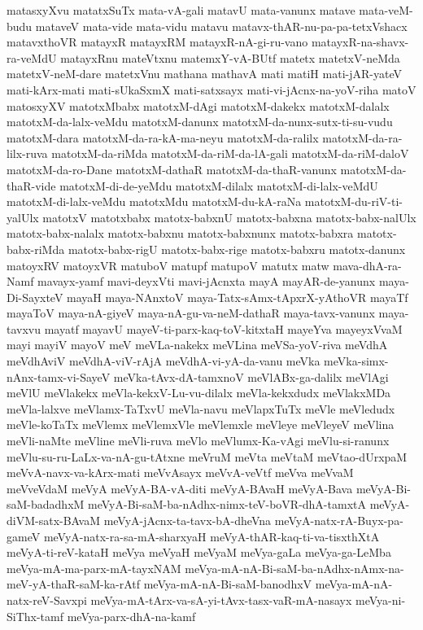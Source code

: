 {matasxyXvu
matatxSuTx
mata-vA-gali
matavU
mata-vanunx
matave
mata-veM-budu
mataveV
mata-vide
mata-vidu
matavu
matavx-thAR-nu-pa-pa-tetxVshacx
matavxthoVR
matayxR
matayxRM
matayxR-nA-gi-ru-vano
matayxR-na-shavx-ra-veMdU
matayxRnu
mateVtxnu
matemxY-vA-BUtf
matetx
matetxV-neMda
matetxV-neM-dare
matetxVnu
mathana
mathavA
mati
matiH
mati-jAR-yateV
mati-kArx-mati
mati-sUkaSxmX
mati-satxsayx
mati-vi-jAcnx-na-yoV-riha
matoV
matosxyXV
matotxMbabx
matotxM-dAgi
matotxM-dakekx
matotxM-dalalx
matotxM-da-lalx-veMdu
matotxM-danunx
matotxM-da-nunx-sutx-ti-su-vudu
matotxM-dara
matotxM-da-ra-kA-ma-neyu
matotxM-da-ralilx
matotxM-da-ra-lilx-ruva
matotxM-da-riMda
matotxM-da-riM-da-lA-gali
matotxM-da-riM-daloV
matotxM-da-ro-Dane
matotxM-dathaR
matotxM-da-thaR-vanunx
matotxM-da-thaR-vide
matotxM-di-de-yeMdu
matotxM-dilalx
matotxM-di-lalx-veMdU
matotxM-di-lalx-veMdu
matotxMdu
matotxM-du-kA-raNa
matotxM-du-riV-ti-yalUlx
matotxV
matotxbabx
matotx-babxnU
matotx-babxna
matotx-babx-nalUlx
matotx-babx-nalalx
matotx-babxnu
matotx-babxnunx
matotx-babxra
matotx-babx-riMda
matotx-babx-rigU
matotx-babx-rige
matotx-babxru
matotx-danunx
matoyxRV
matoyxVR
matuboV
matupf
matupoV
matutx
matw
mava-dhA-ra-Namf
mavayx-yamf
mavi-deyxVti
mavi-jAcnxta
mayA
mayAR-de-yanunx
maya-Di-SayxteV
mayaH
maya-NAnxtoV
maya-Tatx-sAmx-tApxrX-yAthoVR
mayaTf
mayaToV
maya-nA-giyeV
maya-nA-gu-va-neM-dathaR
maya-tavx-vanunx
maya-tavxvu
mayatf
mayavU
mayeV-ti-parx-kaq-toV-kitxtaH
mayeYva
mayeyxVvaM
mayi
mayiV
mayoV
meV
meVLa-nakekx
meVLina
meVSa-yoV-riva
meVdhA
meVdhAviV
meVdhA-viV-rAjA
meVdhA-vi-yA-da-vanu
meVka
meVka-simx-nAnx-tamx-vi-SayeV
meVka-tAvx-dA-tamxnoV
meVlABx-ga-dalilx
meVlAgi
meVlU
meVlakekx
meVla-kekxV-Lu-vu-dilalx
meVla-kekxdudx
meVlakxMDa
meVla-lalxve
meVlamx-TaTxvU
meVla-navu
meVlapxTuTx
meVle
meVledudx
meVle-koTaTx
meVlemx
meVlemxVle
meVlemxle
meVleye
meVleyeV
meVlina
meVli-naMte
meVline
meVli-ruva
meVlo
meVlumx-Ka-vAgi
meVlu-si-ranunx
meVlu-su-ru-LaLx-va-nA-gu-tAtxne
meVruM
meVta
meVtaM
meVtao-dUrxpaM
meVvA-navx-va-kArx-mati
meVvAsayx
meVvA-veVtf
meVva
meVvaM
meVveVdaM
meVyA
meVyA-BA-vA-diti
meVyA-BAvaH
meVyA-Bava
meVyA-Bi-saM-badadhxM
meVyA-Bi-saM-ba-nAdhx-nimx-teV-boVR-dhA-tamxtA
meVyA-diVM-satx-BAvaM
meVyA-jAcnx-ta-tavx-bA-dheVna
meVyA-natx-rA-Buyx-pa-gameV
meVyA-natx-ra-sa-mA-sharxyaH
meVyA-thAR-kaq-ti-va-tisxthXtA
meVyA-ti-reV-kataH
meVya
meVyaH
meVyaM
meVya-gaLa
meVya-ga-LeMba
meVya-mA-ma-parx-mA-tayxNAM
meVya-mA-nA-Bi-saM-ba-nAdhx-nAmx-na-meV-yA-thaR-saM-ka-rAtf
meVya-mA-nA-Bi-saM-banodhxV
meVya-mA-nA-natx-reV-Savxpi
meVya-mA-tArx-va-sA-yi-tAvx-tasx-vaR-mA-nasayx
meVya-ni-SiThx-tamf
meVya-parx-dhA-na-kamf
}
